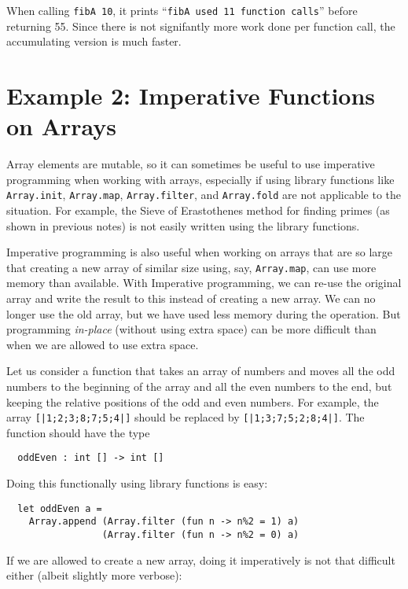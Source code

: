 \documentclass[a4paper]{article}
\begin{document}
\noindent
When calling \texttt{fibA 10}, it prints ``\texttt{fibA used 11
  function calls}'' before returning 55.  Since there is not
signifantly more work done per function call, the accumulating version
is much faster.


\section{Example 2: Imperative Functions on Arrays}

Array elements are mutable, so it can sometimes be useful to use
imperative programming when working with arrays, especially if using
library functions like \texttt{Array.init}, \texttt{Array.map},
\texttt{Array.filter}, and \texttt{Array.fold} are not applicable to
the situation.  For example, the Sieve of Erastothenes method for
finding primes (as shown in previous notes) is not easily written
using the library functions.

Imperative programming is also useful when working on arrays that are
so large that creating a new array of similar size using, say,
\texttt{Array.map}, can use more memory than available.  With
Imperative programming, we can re-use the original array and write the
result to this instead of creating a new array.  We can no longer use
the old array, but we have used less memory during the operation.  But
programming \emph{in-place} (without using extra space) can be more
difficult than when we are allowed to use extra space.

Let us consider a function that takes an array of numbers and moves
all the odd numbers to the beginning of the array and all the even
numbers to the end, but keeping the relative positions of the odd and
even numbers.  For example, the array \texttt{[|1;2;3;8;7;5;4|]}
should be replaced by \texttt{[|1;3;7;5;2;8;4|]}.  The function should
have the type

\begin{verbatim}
  oddEven : int [] -> int []
\end{verbatim}

\noindent
Doing this functionally using library functions is easy:

\begin{verbatim}
  let oddEven a =
    Array.append (Array.filter (fun n -> n%2 = 1) a)
                 (Array.filter (fun n -> n%2 = 0) a)
\end{verbatim}

\noindent
If we are allowed to create a new array, doing it imperatively is not
that difficult either (albeit slightly more verbose):
\end{document}
